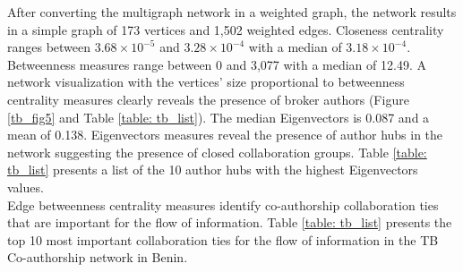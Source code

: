 After converting the multigraph network in a weighted graph, the network results in a simple graph of 173 vertices and 1,502 weighted edges. Closeness centrality ranges between $3.68\times 10^{-5}$ and $3.28\times 10^{-4}$ with a median of $3.18\times 10^{-4}$. Betweenness measures range between 0 and 3,077 with a median of 12.49. A network visualization with the vertices' size proportional to betweenness centrality measures clearly reveals the presence of broker authors (Figure \ref{tb_fig5} and Table \ref{table: tb_list}). The median Eigenvectors is 0.087 and a mean of 0.138. Eigenvectors measures reveal the presence of author hubs in the network suggesting the presence of closed collaboration groups. Table \ref{table: tb_list} presents a list of the 10 author hubs with the highest Eigenvectors values.\\
Edge betweenness centrality measures identify co-authorship collaboration ties that are important for the flow of information. Table \ref{table: tb_list} presents the top 10 most important collaboration ties for the flow of information in the TB Co-authorship network in Benin.\\

